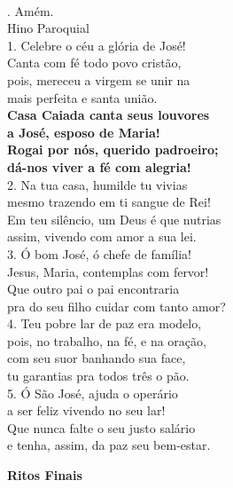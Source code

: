 \documentclass{book}
\begin{document}
\begin{flushleft}
    \vspace{.2cm} \\
    {\color{VioletRed2} \Rbar.} Amém.
    \vspace{.2cm} \\
    \textcolor{VioletRed2}{Hino Paroquial}
    \vspace{.2cm} \\
    1. Celebre o céu a glória de José! \\
    Canta com fé todo povo cristão, \\
    pois, mereceu a virgem se unir na \\
    mais perfeita e santa união.
    \vspace{.2cm} \\
    \textbf{Casa Caiada canta seus louvores \\
        a José, esposo de Maria! \\
        Rogai por nós, querido padroeiro; \\
        dá-nos viver a fé com alegria!}
    \vspace{.2cm} \\
    2. Na tua casa, humilde tu vivias \\
    mesmo trazendo em ti sangue de Rei! \\
    Em teu silêncio, um Deus é que nutrias \\
    assim, vivendo com amor a sua lei. \\
    3. Ó bom José, ó chefe de família! \\
    Jesus, Maria, contemplas com fervor! \\
    Que outro pai o pai encontraria \\
    pra do seu filho cuidar com tanto amor? \\
    4. Teu pobre lar de paz era modelo, \\
    pois, no trabalho, na fé, e na oração, \\
    com seu suor banhando sua face, \\
    tu garantias pra todos três o pão. \\
    5. Ó São José, ajuda o operário \\
    a ser feliz vivendo no seu lar! \\
    Que nunca falte o seu justo salário \\
    e tenha, assim, da paz seu bem-estar.
\end{flushleft}
\begin{center}
    \textbf{Ritos Finais}
\end{center}
\end{document}
